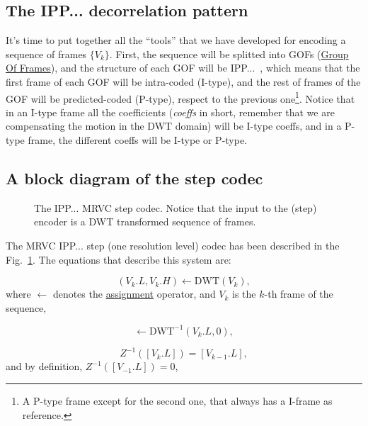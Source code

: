 \subsection{The IPP... decorrelation pattern}
It's time to put together all the ``tools'' that we have developed for
encoding a sequence of frames $\{V_k\}$. First, the sequence will be
splitted into GOFs
(\href{https://en.wikipedia.org/wiki/Group_of_pictures}{Group Of
  Frames}), and the structure of each GOF will be
IPP...~\cite{le1991mpeg}, which means that the first frame of each GOF
will be intra-coded (I-type), and the rest of frames of the GOF will
be predicted-coded (P-type), respect to the previous one\footnote{A
  P-type frame except for the second one, that always has a I-frame as
  reference.}. Notice that in an I-type frame all the coefficients
(\emph{coeffs} in short, remember that we are compensating the motion
in the DWT domain) will be I-type coeffs, and in a P-type frame, the
different coeffs will be I-type or P-type.

\subsection{A block diagram of the step codec}

\begin{figure}
  \centering
  \caption{The IPP... MRVC step codec. Notice that the input to the
    (step) encoder is a DWT transformed sequence of frames.}
  \label{fig:codec}
\end{figure}

The MRVC IPP... step (one resolution level) codec has been described in the
Fig.~\ref{fig:codec}. The equations that describe this system are:

\begin{equation}
  (V_k.L, V_k.H) \leftarrow \text{DWT}(V_k),
  \tag{a}
\end{equation}
where $\leftarrow$ denotes the
\href{https://en.wikipedia.org/wiki/Assignment_(computer_science)}{assignment}
operator, and $V_k$ is the $k$-th frame of the sequence,

\begin{equation}
  [V_k.L] \leftarrow \text{DWT}^{-1}(V_k.L, 0),
  \tag{E.a}
\end{equation}

\begin{equation}
  Z^{-1}([V_k.L]) = [V_{k-1}.L],
  \tag{E.b}
\end{equation}
and by definition, $Z^{-1}([V_{-1}.L]) = 0$,

